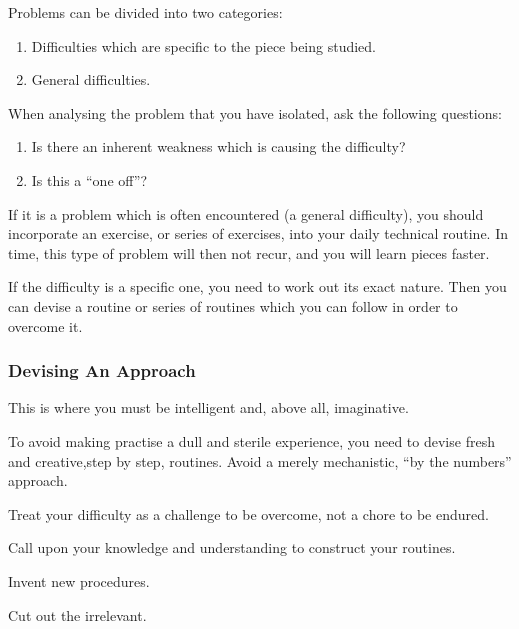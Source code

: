 \documentclass{article}
\begin{document}
Problems can be divided into two categories:

\begin{enumerate}
    \item Difficulties which are specific to the piece being studied.
    \item General difficulties.
\end{enumerate}

When analysing the problem that you have isolated, ask the following questions:

\begin{enumerate}
    \item Is there an inherent weakness which is causing the difficulty?
    \item Is this a ``one off''?
\end{enumerate}

If it is a problem which is often encountered (a general difficulty), you should incorporate an exercise, or series of exercises, into your daily technical routine.\footnotemark
In time, this type of problem will then not recur, and you will learn pieces faster.

If the difficulty is a specific one, you need to work out its exact nature.
Then you can devise a routine or series of routines which you can follow in order to overcome it.


\subsubsection{Devising An Approach}

This is where you must be intelligent and, above all, imaginative.

To avoid making practise a dull and sterile experience, you need to devise fresh and creative,step by step, routines.
Avoid a merely mechanistic, ``by the numbers'' approach.

Treat your difficulty as a challenge to be overcome, not a chore to be endured.

Call upon your knowledge and understanding to construct your routines.

Invent new procedures.

Cut out the irrelevant.
\end{document}
